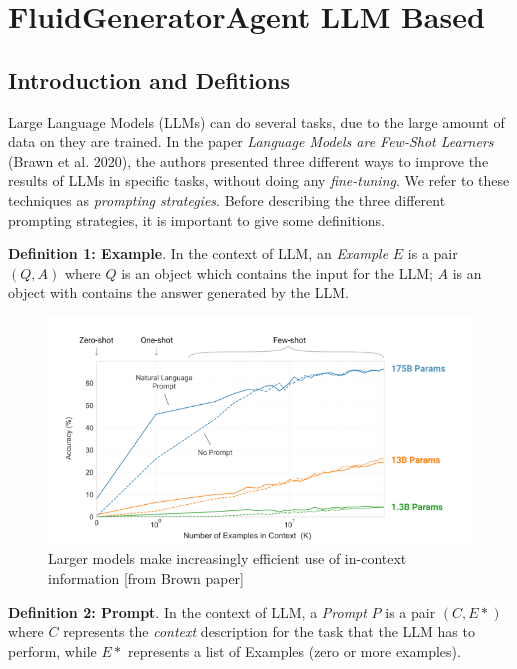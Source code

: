 \section{FluidGeneratorAgent LLM Based}

\subsection{Introduction and Defitions}

Large Language Models (LLMs) can do several tasks, due to the large amount of data on they are trained. In the paper \textit{Language Models are Few-Shot Learners} (Brawn et al. 2020), the authors presented three different ways to improve the results of LLMs in specific tasks, without doing any \textit{fine-tuning}. We refer to these techniques as \textit{prompting strategies}. Before describing the three different prompting strategies, it is important to give some definitions.

\textbf{Definition 1: Example}. In the context of LLM, an \textit{Example} $E$ is a pair $(Q, A)$ where $Q$ is an object which contains the input for the LLM; $A$ is an object with contains the answer generated by the LLM.

\begin{figure}[!h]
    \centering
    \includegraphics[width=1\linewidth]{fig/image.png}
    \caption{Larger models make increasingly efficient use of in-context information [from Brown paper]}
    \label{fig:enter-label}
\end{figure}

\textbf{Definition 2: Prompt}. In the context of LLM, a \textit{Prompt} $P$ is a pair $(C, E*)$ where $C$ represents the \textit{context} description for the task that the LLM has to perform, while $E*$ represents a list of Examples (zero or more examples).

